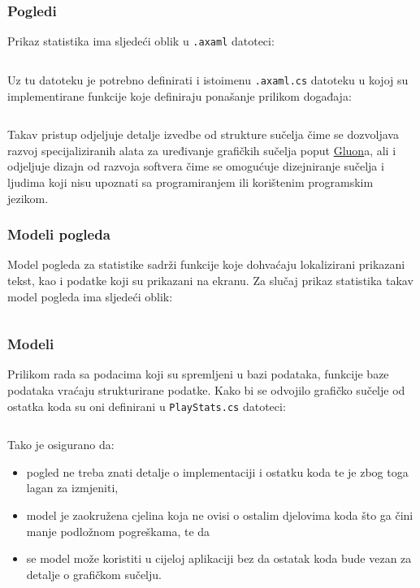 \documentclass[12pt,a4paper]{report}
\begin{document}
\subsubsection{Pogledi}

Prikaz statistika ima sljedeći oblik u \verb|.axaml| datoteci:

\inputminted[breaklines,breakanywhere,fontsize=\scriptsize]{xml}{../Wordel/Wordel/Views/StatsView.axaml}

Uz tu datoteku je potrebno definirati i istoimenu \verb|.axaml.cs| datoteku u
kojoj su implementirane funkcije koje definiraju ponašanje prilikom događaja:

\inputminted[breaklines]{cs}{../Wordel/Wordel/Views/StatsView.axaml.cs}

Takav pristup odjeljuje detalje izvedbe od strukture sučelja čime se dozvoljava
razvoj specijaliziranih alata za uređivanje grafičkih sučelja poput
\href{https://gluonhq.com/}{Gluon}a, ali i odjeljuje dizajn od razvoja softvera
čime se omogućuje dizejniranje sučelja i ljudima koji nisu upoznati sa
programiranjem ili korištenim programskim jezikom.

\subsubsection{Modeli pogleda}

Model pogleda za statistike sadrži funkcije koje dohvaćaju lokalizirani
prikazani tekst, kao i podatke koji su prikazani na ekranu. Za slučaj prikaz
statistika takav model pogleda ima sljedeći oblik:

\inputminted[breaklines]{cs}{../Wordel/Wordel/ViewModels/StatsViewModel.cs}

\subsubsection{Modeli}

Prilikom rada sa podacima koji su spremljeni u bazi podataka, funkcije baze
podataka vraćaju strukturirane podatke. Kako bi se odvojilo grafičko sučelje od
ostatka koda su oni definirani u \verb|PlayStats.cs| datoteci:

\inputminted{cs}{../Wordel/Wordel/Model/PlayStats.cs}

Tako je osigurano da:
\begin{itemize}
    \item pogled ne treba znati detalje o implementaciji i ostatku koda te je
          zbog toga lagan za izmjeniti,
    \item model je zaokružena cjelina koja ne ovisi o ostalim djelovima koda
          što ga čini manje podložnom pogreškama, te da
    \item se model može koristiti u cijeloj aplikaciji bez da ostatak koda bude
          vezan za detalje o grafičkom sučelju.
\end{itemize}
\end{document}
